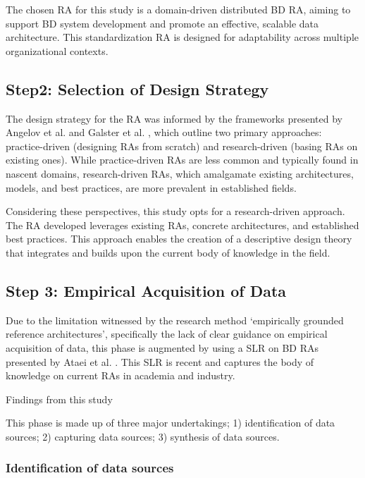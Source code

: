 \documentclass[review]{elsarticle}
\begin{document}
The chosen RA for this study is a domain-driven distributed BD RA, aiming to support BD system development and promote an effective, scalable data architecture. This standardization RA is designed for adaptability across multiple organizational contexts.


\subsection{Step2: Selection of Design Strategy}

The design strategy for the RA was informed by the frameworks presented by Angelov et al. \cite{angelov2008towards} and Galster et al. \cite{galster2011empirically}, which outline two primary approaches: practice-driven (designing RAs from scratch) and research-driven (basing RAs on existing ones). While practice-driven RAs are less common and typically found in nascent domains, research-driven RAs, which amalgamate existing architectures, models, and best practices, are more prevalent in established fields.

Considering these perspectives, this study opts for a research-driven approach. The RA developed leverages existing RAs, concrete architectures, and established best practices. This approach enables the creation of a descriptive design theory that integrates and builds upon the current body of knowledge in the field.


\subsection{Step 3: Empirical Acquisition of Data } \label{theSLR}

 Due to the limitation witnessed by the research method 
`empirically grounded reference architectures', specifically the lack of clear guidance on empirical acquisition of data, this phase is augmented by using a SLR on BD RAs presented by Ataei et al. \cite{ataei2022state}. This SLR is recent and captures the body of knowledge on current RAs in academia and industry.

Findings from this study 



This phase is made up of three major undertakings; 1) identification of data sources; 2) capturing data sources; 3) synthesis of data sources.

\subsubsection{Identification of data sources}
\end{document}
